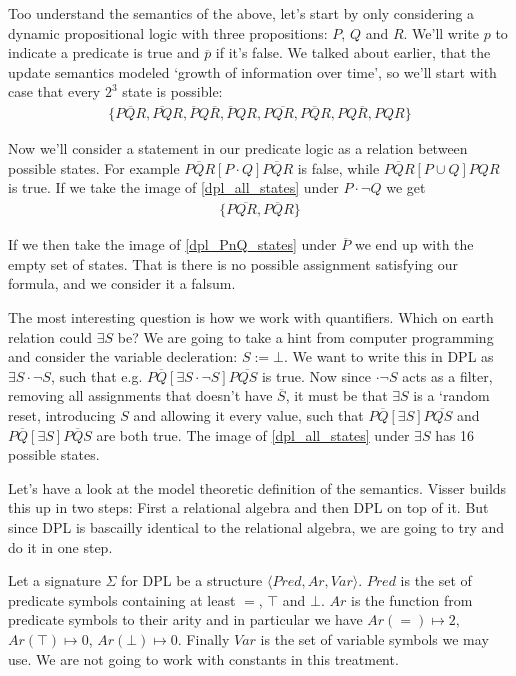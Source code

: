 \documentclass[12pt]{article}
\begin{document}
Too understand the semantics of the above, let's start by only considering a dynamic propositional logic with three propositions: $P$, $Q$ and $R$. We'll write $p$ to indicate a predicate is true and $\overline{p}$ if it's false. We talked about earlier, that the update semantics modeled `growth of information over time', so we'll start with case that every $2^3$ state is possible:
%
\begin{align}
\{\overline{PQR}, \overline{PQ}R, \overline{P}Q\overline{R}, \overline{P}QR, P\overline{QR}, P\overline{Q}R, PQ\overline{R}, PQR\} \label{dpl_all_states}
\end{align}

Now we'll consider a statement in our predicate logic as a relation between possible states. For example $P\overline{Q}R[P\cdot Q]P\overline{Q}R$ is false, while $P\overline{Q}R[P\cup Q]PQR$ is true. If we take the image of \eqref{dpl_all_states} under $P\cdot\neg Q$ we get
%
\begin{align}
\{P\overline{QR}, P\overline{Q}R\} \label{dpl_PnQ_states}
\end{align}

If we then take the image of \eqref{dpl_PnQ_states} under $\overline{P}$ we end up with the empty set of states. That is there is no possible assignment satisfying our formula, and we consider it a falsum.

The most interesting question is how we work with quantifiers. Which on earth relation could $\exists S$ be? We are going to take a hint from computer programming and consider the variable decleration: $S:=\bot$. We want to write this in DPL as $\exists S \cdot \neg S$, such that e.g. $P\overline{Q}[\exists S \cdot \neg S]P\overline{QS}$ is true. Now since $\cdot\neg S$ acts as a filter, removing all assignments that doesn't have $\overline{S}$, it must be that $\exists S$ is a `random reset, introducing $S$ and allowing it every value, such that $P\overline{Q}[\exists S]P\overline{QS}$ and $P\overline{Q}[\exists S]P\overline{Q}S$ are both true. The image of \eqref{dpl_all_states} under $\exists S$ has 16 possible states.

Let's have a look at the model theoretic definition of the semantics. Visser builds this up in two steps: First a relational algebra and then DPL on top of it. But since DPL is bascailly identical to the relational algebra, we are going to try and do it in one step.

Let a signature $\Sigma$ for DPL be a structure $\langle Pred, Ar, Var\rangle$. $Pred$ is the set of predicate symbols containing at least $=$, $\top$ and $\bot$. $Ar$ is the function from predicate symbols to their arity and in particular we have $Ar(=) \mapsto 2$, $Ar(\top) \mapsto 0$, $Ar(\bot) \mapsto 0$. Finally $Var$ is the set of variable symbols we may use. We are not going to work with constants in this treatment.
\end{document}
